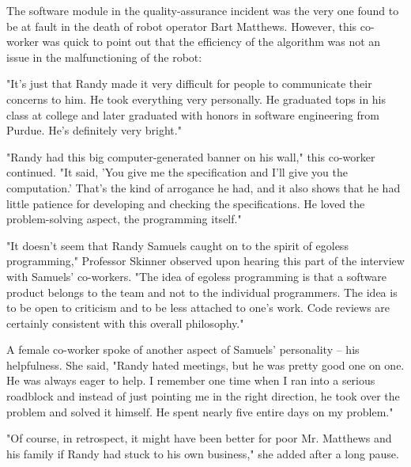 The software module in the quality-assurance incident was the very one found to be at fault in the death of robot operator Bart Matthews. However, this co-worker was quick to point out that the efficiency of the algorithm was not an issue in the malfunctioning of the robot:

"It's just that Randy made it very difficult for people to communicate their concerns to him. He took everything very personally. He graduated tops in his class at college and later graduated with honors in software engineering from Purdue. He's definitely very bright."

"Randy had this big computer-generated banner on his wall," this co-worker continued. "It said, 'You give me the specification and I'll give you the computation.' That's the kind of arrogance he had, and it also shows that he had little patience for developing and checking the specifications. He loved the problem-solving aspect, the programming itself."

"It doesn't seem that Randy Samuels caught on to the spirit of egoless programming," Professor Skinner observed upon hearing this part of the interview with Samuels' co-workers. "The idea of egoless programming is that a software product belongs to the team and not to the individual programmers. The idea is to be open to criticism and to be less attached to one's work. Code reviews are certainly consistent with this overall philosophy."

A female co-worker spoke of another aspect of Samuels' personality -- his helpfulness. She said, "Randy hated meetings, but he was pretty good one on one. He was always eager to help. I remember one time when I ran into a serious roadblock and instead of just pointing me in the right direction, he took over the problem and solved it himself. He spent nearly five entire days on my problem."

"Of course, in retrospect, it might have been better for poor Mr. Matthews and his family if Randy had stuck to his own business," she added after a long pause.
